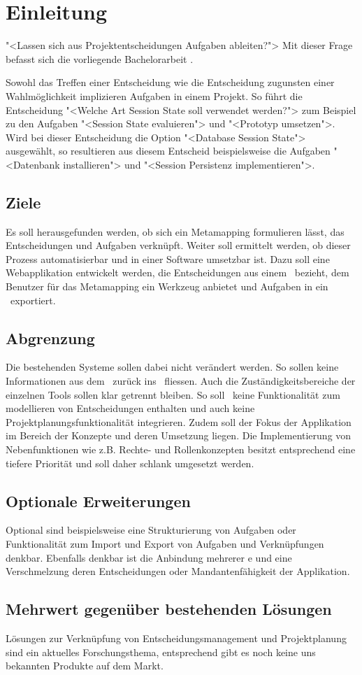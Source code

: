 \chapter{Einleitung}
	"<Lassen sich aus Projektentscheidungen Aufgaben ableiten?">
	Mit dieser Frage befasst sich die vorliegende Bachelorarbeit \eeppi.
		
	Sowohl das Treffen einer Entscheidung wie die Entscheidung zugunsten einer Wahlmöglichkeit implizieren Aufgaben in einem Projekt.
	So führt die Entscheidung "<Welche Art Session State soll verwendet werden?"> zum Beispiel zu den Aufgaben
	"<Session State evaluieren"> und "<Prototyp umsetzen">.		
	Wird bei dieser Entscheidung die Option "<Database Session State"> ausgewählt,
	so resultieren aus diesem Entscheid beispielsweise die Aufgaben "<Datenbank installieren"> und "<Session Persistenz implementieren">.
	
	
	\section{Ziele}
	Es soll herausgefunden werden, ob sich ein Metamapping formulieren lässt,
	das Entscheidungen und Aufgaben verknüpft.
	Weiter soll ermittelt werden, ob dieser Prozess automatisierbar und in einer Software umsetzbar ist.
	Dazu soll eine Webapplikation entwickelt werden, die Entscheidungen aus einem \dks\ bezieht, 
	dem Benutzer für das Metamapping ein Werkzeug anbietet und Aufgaben in ein \ppt\ exportiert.
	
	
	\section{Abgrenzung}
	Die bestehenden Systeme sollen dabei nicht verändert werden. So sollen keine Informationen aus dem \ppt\ zurück ins \dks\ fliessen.
	Auch die Zuständigkeitsbereiche der einzelnen Tools sollen klar getrennt bleiben. So soll \eeppi\ keine Funktionalität zum modellieren von Entscheidungen enthalten und auch keine Projektplanungsfunktionalität integrieren.
	Zudem soll der Fokus der Applikation im Bereich der Konzepte und deren Umsetzung liegen. Die Implementierung von Nebenfunktionen wie z.B. Rechte- und Rollenkonzepten besitzt entsprechend eine tiefere Priorität und soll daher schlank umgesetzt werden.
	
	
	\section{Optionale Erweiterungen}
	Optional sind beispielsweise eine Strukturierung von Aufgaben oder Funktionalität zum Import und Export von Aufgaben und Verknüpfungen denkbar.	
	Ebenfalls denkbar ist die Anbindung mehrerer \dks e und eine Verschmelzung deren Entscheidungen oder Mandantenfähigkeit der Applikation.
	
	
	\section{Mehrwert gegenüber bestehenden Lösungen}
	Lösungen zur Verknüpfung von Entscheidungsmanagement und Projektplanung sind ein aktuelles Forschungsthema, 
	entsprechend gibt es noch keine uns bekannten Produkte auf dem Markt.
	 		
		
	